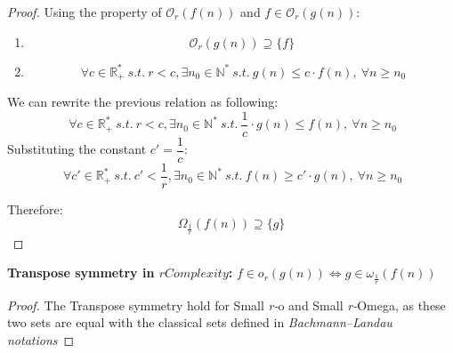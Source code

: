 \begin{proof}
    Using the property of $ \mathcal{O}_{r}(f(n))$ and $f \in \mathcal{O}_{r}(g(n))$:
    \begin{enumerate}[label=(\roman*)]
        \item
        \[\mathcal{O}_{r}(g(n)) \supseteq \lbrace f \rbrace \]
        \item
        \[ \ \forall c  \in \mathbb{R}^{*}_{+} \ s.t.\  r<c, \exists n_{0} \in \mathbb{N}^{*}\ s.t.\  g(n) \leq c \cdot f(n),\  \forall n \geq n_{0} \]
    \end{enumerate}
    We can rewrite the previous relation as following:
    \[ \ \forall c  \in \mathbb{R}^{*}_{+} \ s.t.\  r<c, \exists n_{0} \in \mathbb{N}^{*}\ s.t.\  \dfrac{1}{c} \cdot g(n) \leq f(n),\  \forall n \geq n_{0} \]
    Substituting the constant $ c' = \dfrac{1}{c}$:
    \[ \ \forall c'  \in \mathbb{R}^{*}_{+} \ s.t.\  c' < \dfrac{1}{r}, \exists n_{0} \in \mathbb{N}^{*}\ s.t.\  f(n) \geq c' \cdot g(n) ,\  \forall n \geq n_{0} \]

    Therefore:
    \[\Omega_{\frac{1}{r}}(f(n)) \supseteq \lbrace g \rbrace \]
\end{proof}
\begin{theorem}
    \textbf{Transpose symmetry in $rComplexity$:}
    $ f \in o_{r}(g(n)) \Leftrightarrow g \in \omega_{\frac{1}{r}}(f(n)) $
\end{theorem}

\begin{proof}
    The Transpose symmetry hold for Small \textit{r-}o and Small \textit{r-}Omega, as these two sets are equal with the classical sets defined in \textit{Bachmann–Landau notations}
\end{proof}


